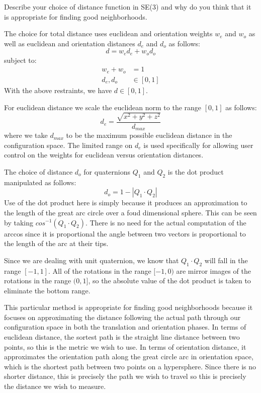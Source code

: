 \pagebreak
\question{[5]}

Describe your choice of distance function in SE(3) and why do you think that it
is appropriate for finding good neighborhoods.

The choice for total distance uses euclidean and orientation weights $w_e$ and
$w_o$ as well as euclidean and orientation distances $d_e$ and $d_o$ as
follows:
$$d = w_ed_e + w_od_o$$
subject to:
\begin{align*}
w_e + w_o &= 1 \\
d_e, d_o &\in [0,1]
\end{align*}
With the above restraints, we have $d \in [0,1]$.

For euclidean distance we scale the euclidean norm to the range $[0,1]$ as
follows:
$$d_e = \dfrac{\sqrt{x^2 + y^2 + z^2}}{d_{max}}$$
where we take $d_{max}$ to be the maximum possible euclidean distance in the
configuration space. The limited range on $d_e$ is used specifically for
allowing user control on the weights for euclidean versus orientation distances.

The choice of distance $d_o$ for quaternions $Q_1$ and $Q_2$ is the dot product
manipulated as follows:
$$d_o = 1 - |Q_1 \cdot Q_2|$$
Use of the dot product here is simply because it produces an approximation
to the length of the great arc circle over a foud dimensional sphere. This
can be seen by taking $cos^{-1}(Q_1 \cdot Q_2)$. There is no need for the actual
computation of the arccos since it is proportional the angle between two
vectors is proportional to the length of the arc at their tips.

Since we are dealing with unit quaternion, we know that $Q_1 \cdot Q_2$ will
fall in the range $[-1, 1]$. All of the rotations in the range $[-1,0)$ are mirror
images of the rotations in the range $(0,1]$, so the absolute value of the
dot product is taken to eliminate the bottom range.

This particular method is appropriate for finding good neighborhoods because it
focuses on approximating the distance following the actual path through our
configuration space in both the translation and orientation phases.
In terms of euclidean distance, the sortest path is the straight line distance
between two points, so this is the metric we wish to use.
In terms of orientation distance, it approximates the orientation path along
the great circle arc in orientation space, which is the shortest path between
two points on a hypersphere. Since there is no shorter distance, this is
precisely the path we wish to travel so this is precisely the distance we wish
to measure.